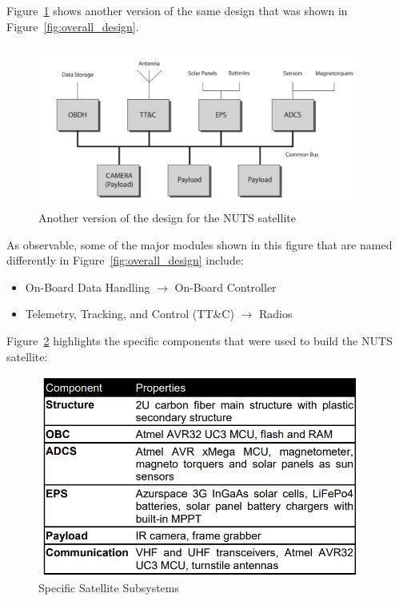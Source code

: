 \documentclass[12pt, a4paper]{report}
\begin{document}
Figure~\ref{fig:overall_design_2} shows another version of the same design that was shown in Figure~\ref{fig:overall_design}.

\begin{figure}[H]
    \centering
    \includegraphics[width=300pt]{images/nuts_design2.PNG}
    \caption{Another version of the design for the NUTS satellite \cite{power_distribution}}
    \label{fig:overall_design_2}
\end{figure}

As observable, some of the major modules shown in this figure that are named differently in Figure~\ref{fig:overall_design} include:

\begin{itemize}
    \item On-Board Data Handling \(\rightarrow\) On-Board Controller
    \item Telemetry, Tracking, and Control (TT\&C) \(\rightarrow\) Radios
\end{itemize}

Figure~\ref{fig:subsystems} highlights the specific components that were used to build the NUTS satellite:

\begin{figure}[H]
    \centering
    \includegraphics[width=300pt]{images/nuts_subsystems.PNG}
    \caption{Specific Satellite Subsystems\cite{overview}}
    \label{fig:subsystems}
\end{figure}
\end{document}
